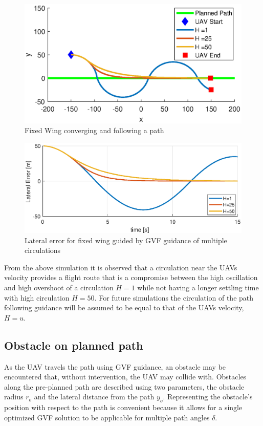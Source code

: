 \documentclass[numbered,pdftex]{ohio-etd}
\begin{document}
\begin{figure}[H]
	\centering
	\includegraphics[trim=0 30 0 65,clip,width=14cm]{PaperFigures/Methods/pathMultipleHs}
	\caption{Fixed Wing converging and following a path}
	\label{fig:uavPathMultipleHs}
\end{figure}


\begin{figure}[H]
	\centering
	\includegraphics[trim=0 0 0 0,clip,width=16cm]{PaperFigures/Methods/lateralErrorVsTime}
	\caption{Lateral error for fixed wing guided by GVF guidance of multiple circulations}
	\label{fig:uavPathMultipleHsLateral}
\end{figure}

From the above simulation it is observed that a circulation near the UAVs velocity provides a flight route that is a compromise between the high oscillation and high overshoot of a circulation $H=1$ while not having a longer settling time with high circulation $H=50$. For future simulations the circulation of the path following guidance will be assumed to be equal to that of the UAVs velocity, $H=u$. \\

\subsection{Obstacle on planned path}
As the UAV travels the path using GVF guidance, an obstacle may be encountered that, without intervention, the UAV may collide with. Obstacles along the pre-planned path are described using two parameters, the obstacle radius $r_o$ and the lateral distance from the path $y_o$. Representing the obstacle's position with respect to the path is convenient because it allows for a single optimized GVF solution to be applicable for multiple path angles $\delta$.
\end{document}
